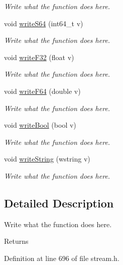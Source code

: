 \begin{DoxyCompactItemize}
\begin{DoxyCompactList}\small\item\em Write what the function does here. \end{DoxyCompactList}\item 
void \hyperlink{classWriter_a293a714331946c20921f8bdcaaf8fb45}{write\+S64} (int64\+\_\+t v)
\begin{DoxyCompactList}\small\item\em Write what the function does here. \end{DoxyCompactList}\item 
void \hyperlink{classWriter_a8816378c8b285c9c32e9ce852321bea6}{write\+F32} (float v)
\begin{DoxyCompactList}\small\item\em Write what the function does here. \end{DoxyCompactList}\item 
void \hyperlink{classWriter_ac3bd2e371437c63ff9a9d61be5578b7c}{write\+F64} (double v)
\begin{DoxyCompactList}\small\item\em Write what the function does here. \end{DoxyCompactList}\item 
void \hyperlink{classWriter_a473689a8f2ce7c1689db055fc7030773}{write\+Bool} (bool v)
\begin{DoxyCompactList}\small\item\em Write what the function does here. \end{DoxyCompactList}\item 
void \hyperlink{classWriter_aaab90e47e77581ec8aaab248c26e726e}{write\+String} (wstring v)
\begin{DoxyCompactList}\small\item\em Write what the function does here. \end{DoxyCompactList}\end{DoxyCompactItemize}


\subsection{Detailed Description}
Write what the function does here. 

\begin{DoxyReturn}{Returns}

\end{DoxyReturn}


Definition at line 696 of file stream.\+h.



